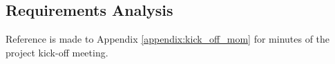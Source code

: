 \subsection{Requirements Analysis}

Reference is made to Appendix \ref{appendix:kick_off_mom} for minutes of the project kick-off meeting.